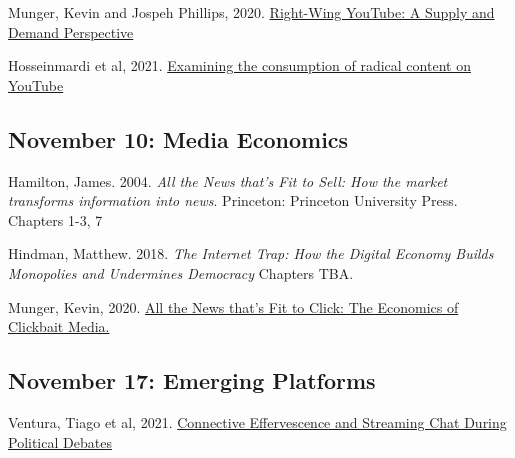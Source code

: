 \vspace{-.1in}\documentclass[11pt]{article}
\begin{document}
\noindent Munger, Kevin and Jospeh Phillips, 2020. \href{https://journals.sagepub.com/doi/pdf/10.1177/1940161220964767?casa_token=pNSl7u_rBX0AAAAA:mlH30Wrj5NEIp9nMD459qqBLaUCBlFjwjCwMSGSmd60OIeuomF4XxXH5eBfzk6A3rcmrDE3I9nmK}{Right-Wing YouTube: A Supply and Demand Perspective
}

\noindent Hosseinmardi et al, 2021.  \href{https://www.pnas.org/content/pnas/118/32/e2101967118.full.pdf?casa_token=vI6yIQS3_M8AAAAA:HCt5StQUZ6kzh4X37RqDc0S7qJibnx9wya3wLUZVHjP-Fij7eNUKP1Wb1kpTPFG4k7yvUoRlpdBMEQ}{Examining the consumption of radical content
	on YouTube
}






\subsection*{November 10: Media Economics}

%

\noindent Hamilton, James. 2004. {\it All the News that's Fit to Sell: How the market transforms information into news}. Princeton: Princeton University Press. Chapters 1-3, 7

\noindent Hindman, Matthew. 2018. \textit{The Internet Trap: How the Digital Economy Builds Monopolies and Undermines Democracy} Chapters TBA.


\noindent Munger, Kevin, 2020. \href{https://www.tandfonline.com/doi/pdf/10.1080/10584609.2019.1687626?casa_token=VSjjEXja4EMAAAAA:Q47ASc0lu3itcu7FAjqifqtnrFQvGFvwCJvG9mE1-g7SDLjLNheR6ZtkURoLvRyW7LRFwxmFR0Di}{All the News that's Fit to Click: The Economics of Clickbait Media.}





\subsection*{November 17: Emerging Platforms}


Ventura, Tiago et al, 2021. \href{https://journalqd.org/article/view/2573/1820}{Connective Effervescence and Streaming Chat During Political Debates}
\end{document}
